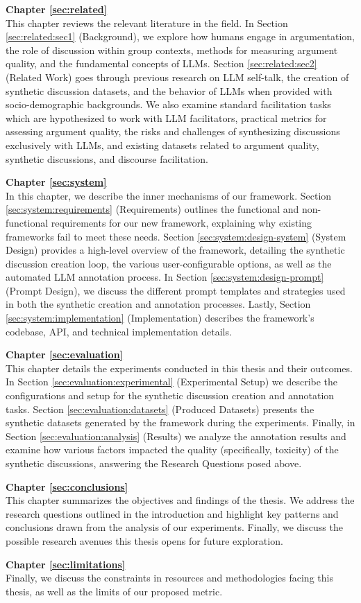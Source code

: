 \textbf{Chapter \ref{sec:related}} \\[0.2em]
This chapter reviews the relevant literature in the field. In Section \ref{sec:related:sec1} (Background), we explore how humans engage in argumentation, the role of discussion within group contexts, methods for measuring argument quality, and the fundamental concepts of \acp{LLM}. Section \ref{sec:related:sec2} (Related Work) goes through previous research on LLM self-talk, the creation of synthetic discussion datasets, and the behavior of LLMs when provided with socio-demographic backgrounds. We also examine standard facilitation tasks which are hypothesized to work with LLM facilitators, practical metrics for assessing argument quality, the risks and challenges of synthesizing discussions exclusively with LLMs, and existing datasets related to argument quality, synthetic discussions, and discourse facilitation.


\textbf{Chapter \ref{sec:system}} \\[0.2em]
In this chapter, we describe the inner mechanisms of our framework. Section \ref{sec:system:requirements} (Requirements) outlines the functional and non-functional requirements for our new framework, explaining why existing frameworks fail to meet these needs. Section \ref{sec:system:design-system} (System Design) provides a high-level overview of the framework, detailing the synthetic discussion creation loop, the various user-configurable options, as well as the automated LLM annotation process. In Section \ref{sec:system:design-prompt} (Prompt Design), we discuss the different prompt templates and strategies used in both the synthetic creation and annotation processes. Lastly, Section \ref{sec:system:implementation} (Implementation) describes the framework's codebase, \ac{API}, and technical implementation details.

\textbf{Chapter \ref{sec:evaluation}} \\[0.2em]
This chapter details the experiments conducted in this thesis and their outcomes. In Section \ref{sec:evaluation:experimental} (Experimental Setup) we describe the configurations and setup for the synthetic discussion creation and annotation tasks. Section \ref{sec:evaluation:datasets} (Produced Datasets)  presents the synthetic datasets generated by the framework during the experiments.  Finally, in Section \ref{sec:evaluation:analysis} (Results) we analyze the annotation results and examine how various factors impacted the quality (specifically, toxicity) of the synthetic discussions, answering the Research Questions posed above.


\textbf{Chapter \ref{sec:conclusions}} \\[0.2em]
This chapter summarizes the objectives and findings of the thesis. We address the research questions outlined in the introduction and highlight key patterns and conclusions drawn from the analysis of our experiments. Finally, we discuss the possible research avenues this thesis opens for future exploration.

\textbf{Chapter \ref{sec:limitations}} \\[0.2em]
Finally, we discuss the constraints in resources and methodologies facing this thesis, as well as the limits of our proposed metric.
